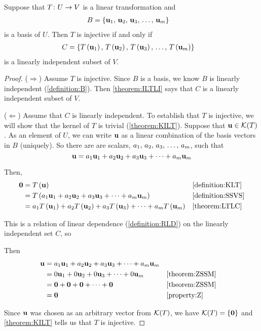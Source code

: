 \documentclass{ximera}
\begin{document}
\begin{theorem}
\label{theorem:ILTB}

Suppose that $T\colon U\rightarrow V$ is a linear transformation and
\begin{align*}
B&=\left\{\mathbf{u}_{1},\,\mathbf{u}_{2},\,\mathbf{u}_{3},\,\ldots,\,\mathbf{u}_{m}\right\}
\end{align*}
is a basis of $U$.  Then $T$ is injective if and only if
\begin{align*}
C&=\left\{T\left(\mathbf{u}_1\right),\,T\left(\mathbf{u}_2\right),\,T\left(\mathbf{u}_3\right),\,\ldots,\,T\left(\mathbf{u}_m\right)\right\}
\end{align*}
is a linearly independent subset of $V$.


\begin{proof}
($\Rightarrow$)  Assume $T$ is injective.  Since $B$ is a basis, we know $B$ is linearly independent (\ref{definition:B}).  Then \ref{theorem:ILTLI} says that $C$ is a linearly independent subset of $V$.



($\Leftarrow$)  Assume that $C$ is linearly independent.  To establish that $T$ is injective, we will show that the kernel of $T$ is trivial (\ref{theorem:KILT}).  Suppose that $\mathbf{u}\in\mathcal{K}\!\left(T\right)$.  As an element of $U$, we can write $\mathbf{u}$ as a linear combination of the basis vectors in $B$ (uniquely).  So there are are scalars, ${a}_{1},\,{a}_{2},\,{a}_{3},\,\ldots,\,{a}_{m}$, such that
\[
\mathbf{u}=a_{1}\mathbf{u}_{1}+a_{2}\mathbf{u}_{2}+a_{3}\mathbf{u}_{3}+\cdots +a_{m}\mathbf{u}_{m}
\]




Then,
\begin{align*}
\mathbf{0}
&=T\left(\mathbf{u}\right)
&&\ref{definition:KLT}\\
&=T\left(a_{1}\mathbf{u}_{1}+a_{2}\mathbf{u}_{2}+a_{3}\mathbf{u}_{3}+\cdots +a_{m}\mathbf{u}_{m}\right)
&&\ref{definition:SSVS}\\
&=a_1T\left(\mathbf{u}_1\right)+a_2T\left(\mathbf{u}_2\right)+a_3T\left(\mathbf{u}_3\right)+\cdots+a_mT\left(\mathbf{u}_m\right)
&&\ref{theorem:LTLC}
\end{align*}




This is a relation of linear dependence (\ref{definition:RLD}) on the linearly independent set $C$, so 
\begin{multipleChoice}
\end{multipleChoice}

Then
\begin{align*}
\mathbf{u}&=a_{1}\mathbf{u}_{1}+a_{2}\mathbf{u}_{2}+a_{3}\mathbf{u}_{3}+\cdots +a_{m}\mathbf{u}_{m}\\
&=0\mathbf{u}_1+0\mathbf{u}_2+0\mathbf{u}_3+\cdots+0\mathbf{u}_m&&\ref{theorem:ZSSM}\\
&=\mathbf{0}+\mathbf{0}+\mathbf{0}+\cdots+\mathbf{0}&&\ref{theorem:ZSSM}\\
&=\mathbf{0}&&\ref{property:Z}
\end{align*}


Since $\mathbf{u}$ was chosen as an arbitrary vector from $\mathcal{K}\!\left(T\right)$, we have $\mathcal{K}\!\left(T\right)=\left\{\mathbf{0}\right\}$ and \ref{theorem:KILT} tells us that $T$ is injective.

\end{proof}
\end{theorem}
\end{document}
